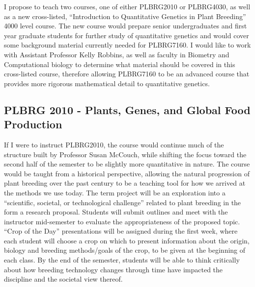 \documentclass[10pt]{article}
\begin{document}

I propose to teach two courses, one of either PLBRG2010 or PLBRG4030, as well as a new cross-listed, ``Introduction to Quantitative Genetics in Plant Breeding'' 4000 level course. The new course would prepare senior undergraduates and first year graduate students for further study of quantitative genetics and would cover some background material currently needed for PLBRG7160. I would like to work with Assistant Professor Kelly Robbins, as well as faculty in Biometry and Computational biology to determine what material should be covered in this cross-listed course, therefore allowing PLBRG7160 to be an advanced course that provides more rigorous mathematical detail to quantitative genetics.

\subsection*{PLBRG 2010 - Plants, Genes, and Global Food Production}

If I were to instruct PLBRG2010, the course would continue much of the structure built by Professor Susan McCouch, while shifting the focus toward the second half of the semester to be slightly more quantitative in nature. The course would be taught from a historical perspective, allowing the natural progression of plant breeding over the past century to be a teaching tool for how we arrived at the methods we use today. The term project will be an exploration into a ``scientific, societal, or technological challenge'' related to plant breeding in the form a research proposal. Students will submit outlines and meet with the instructor mid-semester to evaluate the appropriateness of the proposed topic. ``Crop of the Day'' presentations will be assigned during the first week, where each student will choose a crop on which to present information about the origin, biology and breeding methods/goals of the crop, to be given at the beginning of each class. By the end of the semester, students will be able to think critically about how breeding technology changes through time have impacted the discipline and the societal view thereof. 
\end{document}
